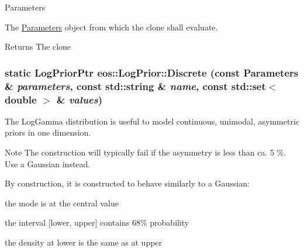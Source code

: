 \begin{DoxyParams}{Parameters}
\item[{\em parameters}]The \hyperlink{classeos_1_1Parameters}{Parameters} object from which the clone shall evaluate. \end{DoxyParams}
\begin{DoxyReturn}{Returns}
The clone 
\end{DoxyReturn}
\hypertarget{classeos_1_1LogPrior_a567e0f1eba8e2dd5c019d6764cbab53c}{
\subsubsection[{Discrete}]{\setlength{\rightskip}{0pt plus 5cm}static {\bf LogPriorPtr} eos::LogPrior::Discrete (const {\bf Parameters} \& {\em parameters}, \/  const std::string \& {\em name}, \/  const std::set$<$ double $>$ \& {\em values})}}
\label{classeos_1_1LogPrior_a567e0f1eba8e2dd5c019d6764cbab53c}
The LogGamma distribution is useful to model continuous, unimodal, asymmetric priors in one dimension.

\begin{DoxyNote}{Note}
The construction will typically fail if the asymmetry is less than ca. 5 \%. Use a Gaussian instead.
\end{DoxyNote}
By construction, it is constructed to behave similarly to a Gaussian:
\begin{DoxyItemize}
\item the mode is at the central value
\item the interval \mbox{[}lower, upper\mbox{]} contains 68\% probability
\item the density at lower is the same as at upper
\end{DoxyItemize}


